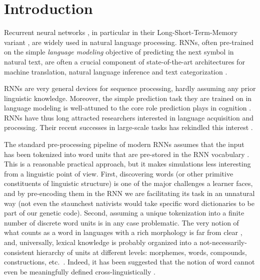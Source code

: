 \section{Introduction}
\label{sec:introduction}


Recurrent neural networks \cite[RNNs,][]{Elman:1990}, in particular
in their Long-Short-Term-Memory variant
\cite[LSTMs,][]{Hochreiter:Schmidhuber:1997}, are widely used in natural language processing. RNNs, often
pre-trained on the simple \emph{language modeling} objective of
predicting the next symbol in natural text, are often a crucial
component of state-of-the-art architectures for machine
translation, natural language inference and text categorization
\cite{Goldberg:2017}.

RNNs are very general devices for sequence processing, hardly assuming
any prior linguistic knowledge. Moreover, the simple prediction task
they are trained on in language modeling is well-attuned to the core
role prediction plays in cognition
\cite[e.g.,][]{Bar:2007,Clark:2016}. RNNs have thus long attracted
researchers interested in language acquisition and processing. Their
recent successes in large-scale tasks has rekindled
this interest \cite[e.g.,][]{Frank:etal:2013,Lau:etal:2017,Kirov:Cotterell:2018,Linzen:etal:2018,McCoy:etal:2018,Pater:2018}.

The standard pre-processing pipeline of modern RNNs assumes that the
input has been tokenized into word units that are pre-stored in the
RNN vocabulary \cite{Goldberg:2017}. This is a reasonable practical
approach, but it makes simulations less interesting from a linguistic
point of view. First, discovering words (or other primitive
constituents of linguistic structure) is one of the major challenges a
learner faces, and by pre-encoding them in the RNN we are facilitating
its task in an unnatural way (not even the staunchest nativists would
take specific word dictionaries to be part of our genetic
code). Second, assuming a unique tokenization into a finite number of
discrete word units is in any case problematic. The very notion of
what counts as a word in languages with a rich morphology is far from
clear \cite[e.g.,][]{Dixon:Aikhenvald:2002,Bickel:Zuniga:2017}, and,
universally, lexical knowledge is probably organized into a
not-necessarily-consistent hierarchy of units at different levels:
morphemes, words, compounds, constructions,
etc.~\cite[e.g.,][]{Goldberg:2005}. Indeed, it has been suggested that
the notion of word cannot even be meaningfully defined
cross-linguistically \cite{Haspelmath:2011}.

